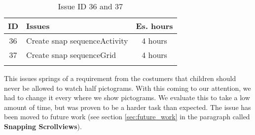\begin{longtable} { | c | p{12cm} | c | } 
\hline
	ID 	&	Issues	&		 Es. hours \\\hline
	36 	&	Create snap sequenceActivity	&	4 hours \\\hline
	37 	&	Create snap sequenceGrid		&	4 hours \\\hline
\caption{Issue ID 36 and 37}
\label{tab:spr3_Snapping}
\end{longtable}
This issues springs of a requirement from the costumers that children should never be allowed to watch half pictograms. With this coming to our attention, we had to change it every where we show pictograms. We evaluate this to take a low amount of time, but was proven to be a harder task than expected. The issue has been moved to future work (see section \ref{sec:future_work} in the paragraph called \textbf{Snapping Scrollviews}).